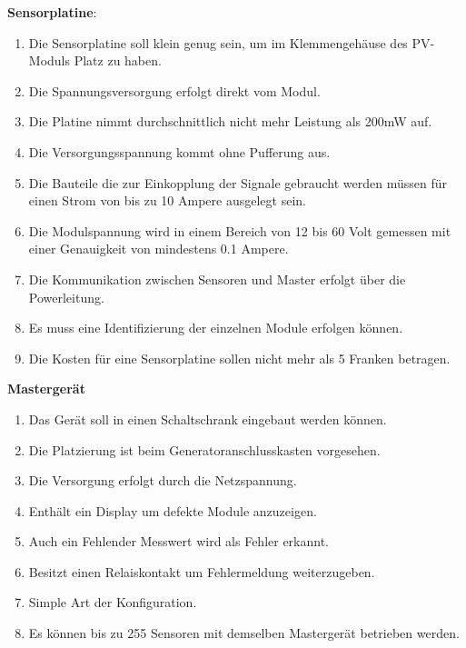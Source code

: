 \textbf{Sensorplatine}:
\begin{enumerate}
    \item
        Die Sensorplatine  soll klein  genug sein, um im  Klemmengeh\"ause des
        PV-Moduls Platz zu haben.
    \item
        Die Spannungsversorgung erfolgt direkt vom Modul.
    \item
        Die Platine nimmt durchschnittlich nicht mehr Leistung als 200mW auf.
    \item
        Die Versorgungsspannung kommt ohne Pufferung aus.
    \item
        Die Bauteile die zur Einkopplung der Signale gebraucht werden m\"ussen
        f\"ur einen Strom von bis zu 10 Ampere ausgelegt sein.
    \item
        Die Modulspannung  wird in einem Bereich  von 12 bis 60  Volt gemessen
        mit einer Genauigkeit von mindestens 0.1 Ampere.
    \item
        Die  Kommunikation zwischen  Sensoren  und Master  erfolgt \"uber  die
        Powerleitung.
    \item
        Es muss eine Identifizierung der einzelnen Module erfolgen k\"onnen.
    \item
        Die Kosten  f\"ur eine Sensorplatine  sollen nicht mehr als  5 Franken
        betragen.
\end{enumerate}

\textbf{Masterger\"at}
\begin{enumerate}
    \item
        Das Ger\"at soll in einen Schaltschrank eingebaut werden k\"onnen.
    \item
        Die Platzierung ist beim Generatoranschlusskasten vorgesehen.
    \item
        Die Versorgung erfolgt durch die Netzspannung.
    \item
        Enth\"alt ein Display um defekte Module anzuzeigen.
    \item
        Auch ein Fehlender Messwert wird als Fehler erkannt.
    \item
        Besitzt einen Relaiskontakt um Fehlermeldung weiterzugeben.
    \item
        Simple Art der Konfiguration.
    \item
        Es k\"onnen bis zu 255  Sensoren mit demselben Masterger\"at betrieben
        werden.
\end{enumerate}


